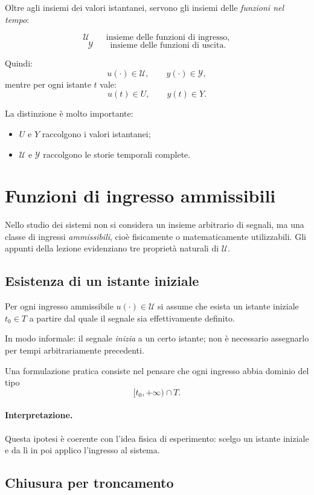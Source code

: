 Oltre agli insiemi dei valori istantanei, servono gli insiemi delle \emph{funzioni nel tempo}:

\[
\mathcal{U} \qquad \text{insieme delle funzioni di ingresso},
\]
\[
\mathcal{Y} \qquad \text{insieme delle funzioni di uscita}.
\]

Quindi:
\[
u(\cdot)\in \mathcal{U}, \qquad y(\cdot)\in \mathcal{Y},
\]
mentre per ogni istante $t$ vale:
\[
u(t)\in U, \qquad y(t)\in Y.
\]

La distinzione è molto importante:
\begin{itemize}
    \item $U$ e $Y$ raccolgono i valori istantanei;
    \item $\mathcal{U}$ e $\mathcal{Y}$ raccolgono le storie temporali complete.
\end{itemize}

\section{Funzioni di ingresso ammissibili}

Nello studio dei sistemi non si considera un insieme arbitrario di segnali, ma una classe di ingressi \emph{ammissibili}, cioè fisicamente o matematicamente utilizzabili.  
Gli appunti della lezione evidenziano tre proprietà naturali di $\mathcal{U}$.

\subsection{Esistenza di un istante iniziale}

Per ogni ingresso ammissibile $u(\cdot)\in \mathcal{U}$ si assume che esista un istante iniziale $t_0\in T$ a partire dal quale il segnale sia effettivamente definito.

In modo informale: il segnale \emph{inizia} a un certo istante; non è necessario assegnarlo per tempi arbitrariamente precedenti.

Una formulazione pratica consiste nel pensare che ogni ingresso abbia dominio del tipo
\[
[t_0,+\infty)\cap T.
\]

\paragraph{Interpretazione.}
Questa ipotesi è coerente con l'idea fisica di esperimento: scelgo un istante iniziale e da lì in poi applico l'ingresso al sistema.

\subsection{Chiusura per troncamento}


